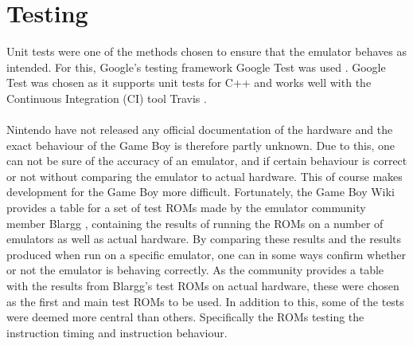 \section{Testing}
Unit tests were one of the methods chosen to ensure that the emulator behaves as intended. For this, Google's testing framework Google Test was used \cite{gtest}. Google Test was chosen as it supports unit tests for C++ and works well with the Continuous Integration (CI) tool Travis \cite{Travis}.
\\\\
Nintendo have not released any official documentation of the hardware and the exact behaviour of the Game Boy is therefore partly unknown. Due to this, one can not be sure of the accuracy of an emulator, and if certain behaviour is correct or not without comparing the emulator to actual hardware. This of course makes development for the Game Boy more difficult. Fortunately, the Game Boy Wiki provides a table for a set of test ROMs \cite{TestROMsResult} made by the emulator community member Blargg \cite{Blargg}, containing the results of running the ROMs on a number of emulators as well as actual hardware. By comparing these results and the results produced when run on a specific emulator, one can in some ways confirm whether or not the emulator is behaving correctly. As the community provides a table with the results from Blargg's test ROMs on actual hardware, these were chosen as the first and main test ROMs to be used. In addition to this, some of the tests were deemed more central than others. Specifically the ROMs testing the instruction timing and instruction behaviour.
